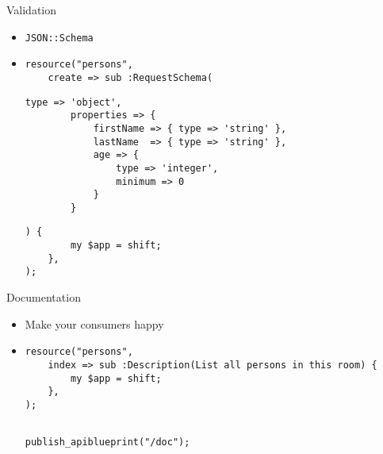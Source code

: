 
\begin{frame}[fragile]{Validation}
\pause
\begin{itemize}
\item \texttt{JSON::Schema}\cite{json-schema}
\pause
\item[]
\begin{lstlisting}
resource("persons",
    create => sub :RequestSchema(
\end{lstlisting}\pause\begin{lstlisting}[firstnumber=last,style=red]
        type => 'object',
        properties => {
            firstName => { type => 'string' },
            lastName  => { type => 'string' },
            age => {
                type => 'integer',
                minimum => 0
            }
        }
\end{lstlisting}\pause\begin{lstlisting}[firstnumber=last]
    ) {
        my $app = shift;
    },
);
\end{lstlisting}
\end{itemize}
\end{frame}


\begin{frame}[fragile]{Documentation}
\pause
\begin{itemize}
\item Make your consumers happy
\pause
\item[]
\begin{lstlisting}
resource("persons",
    index => sub :Description(List all persons in this room) {
        my $app = shift;
    },
);
\end{lstlisting}\pause\begin{lstlisting}[firstnumber=last]

publish_apiblueprint("/doc");
\end{lstlisting}
\end{itemize}
\end{frame}


